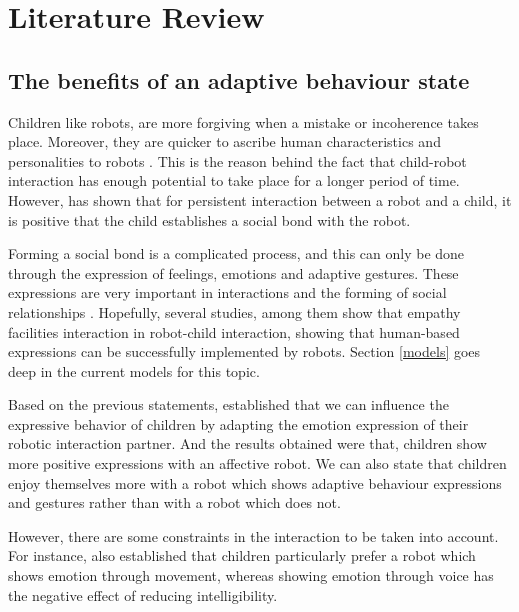\chapter{Literature Review} \label{chap:litReview}

\section{The benefits of an adaptive behaviour state}

Children like robots, are more forgiving when a mistake or incoherence takes place. Moreover, they are quicker to ascribe human characteristics and personalities to robots \cite{beran2011understanding}. This is the reason behind the fact that child-robot interaction has enough potential to take place for a longer period of time. However, \cite{kanda2007two} has shown that for persistent interaction between a robot and a child, it is positive that the child establishes a social bond with the robot. 

Forming a social bond is a complicated process, and this can only be done through the expression of feelings, emotions and adaptive gestures. These expressions are very important in interactions and the forming of social relationships \cite{butler2003social}\cite{mcneill1992hand}. Hopefully, several studies, among them \cite{leite2012modelling} show that empathy facilities interaction in robot-child interaction, showing that human-based expressions can be successfully implemented by robots. Section \ref{models} goes deep in the current models for this topic.

Based on the previous statements, \cite{beran2011understanding} established that we can influence the expressive behavior of children by adapting the emotion expression of their robotic interaction partner. And the results obtained were that, children show more positive expressions with an affective robot. We can also state that children enjoy themselves more with a robot which shows adaptive behaviour expressions and gestures rather than with a robot which does not.

However, there are some constraints in the interaction to be taken into account. For instance, \cite{beran2011understanding} also established that children particularly prefer a robot which shows emotion through movement, whereas showing emotion through voice has the negative effect of reducing intelligibility.

